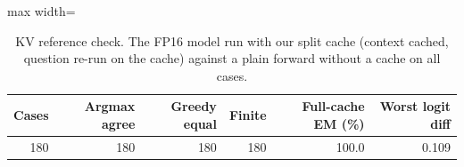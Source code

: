 \begin{table}[!htb]
\centering
\scriptsize
\setlength{\tabcolsep}{3.5pt}
\caption{KV reference check. The FP16 model run with our split cache (context cached, question re-run on the cache) against a plain forward without a cache on all cases.}
\label{tab:t2cc1}
\begin{adjustbox}{max width=\linewidth}
\begin{tabular}{rrrrrr}
\toprule
Cases & Argmax agree & Greedy equal & Finite & Full-cache EM (\%) & Worst logit diff \\
\midrule
180 & 180 & 180 & 180 & 100.0 & 0.109 \\
\bottomrule
\end{tabular}
\end{adjustbox}
\end{table}
